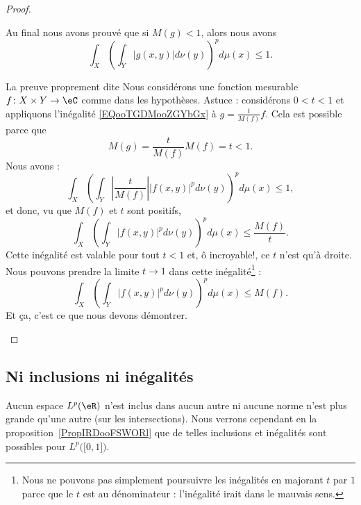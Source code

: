 \begin{proof}
\begin{subproof}
\begin{itemize}
		\end{itemize}
		Au final nous avons prouvé que si \( M(g)<1\), alors nous avons
		\begin{equation}        \label{EQooTGDMooZGYbGx}
			\int_X\left( \int_Y| g(x,y) |d\nu(y) \right)^pd\mu(x)\leq 1.
		\end{equation}
		\item[La preuve proprement dite]
		Nous considérons une fonction mesurable \( f\colon X\times Y\to \eC\) comme dans les hypothèses. Astuce : considérons \( 0<t<1\) et appliquons l'inégalité \eqref{EQooTGDMooZGYbGx} à \( g=\frac{ t }{ M(f) }f\). Cela est possible parce que
		\begin{equation}
			M(g)=\frac{ t }{ M(f) }M(f)=t<1.
		\end{equation}
		Nous avons :
		\begin{equation}
			\int_X\left( \int_Y| \frac{ t }{ M(f) } | |f(x,y) |^pd\nu(y) \right)^pd\mu(x)\leq 1,
		\end{equation}
		et donc, vu que \( M(f)\) et \( t\) sont positifs,
		\begin{equation}
			\int_X\left( \int_Y| f(x,y) |^pd\nu(y) \right)^pd\mu(x)\leq \frac{ M(f) }{ t }.
		\end{equation}
		Cette inégalité est valable pour tout \( t<1\) et, ô incroyable!, ce \( t\) n'est qu'à droite. Nous pouvons prendre la limite \( t\to 1\) dans cette inégalité\footnote{Nous ne pouvons pas simplement poursuivre les inégalités en majorant $ t$ par $ 1$ parce que le $ t$ est au dénominateur : l'inégalité irait dans le mauvais sens.}  :
		\begin{equation}
			\int_X\left( \int_Y| f(x,y) |^pd\nu(y) \right)^pd\mu(x)\leq M(f).
		\end{equation}
		Et ça, c'est ce que nous devons démontrer.
	\end{subproof}

\end{proof}


\subsection{Ni inclusions ni inégalités}

Aucun espace \( L^p(\eR)\) n'est inclus dans aucun autre ni aucune norme n'est plus grande qu'une autre (sur les intersections). Nous verrons cependant en la proposition~\ref{PropIRDooFSWORl} que de telles inclusions et inégalités sont possibles pour \( L^p\big( \mathopen[ 0 , 1 \mathclose] \big)\).

